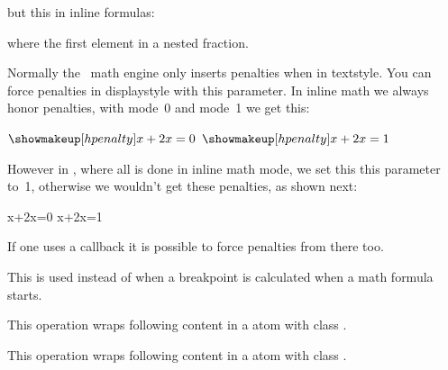 \def\foo{(\the\mathmainstyle,\the\mathparentstyle,\the\mathstyle)}

\dm{
    \frac{\frac{\foo}{\foo}}{\frac{\foo}{\foo}} + \foo
}

but this in inline formulas:

\im{
    \frac{\frac{\foo}{\foo}}{\frac{\foo}{\foo}} + \foo
}

where the first element in a nested fraction.

\stopnewprimitive

\startnewprimitive[title={\prm {mathpenaltiesmode}}]

Normally the \TEX\ math engine only inserts penalties when in textstyle. You can
force penalties in displaystyle with this parameter. In inline math we always
honor penalties, with mode~0 and mode~1 we get this:

\pushoverloadmode

\startlines
{ \let\mathpenaltiesmode\scratchcounter $\showmakeup[hpenalty]x+2x=0$}
{ \let\mathpenaltiesmode\scratchcounter $\showmakeup[hpenalty]x+2x=1$}
\stoplines

However in \CONTEXT, where all is done in inline math mode, we set this this
parameter to~1, otherwise we wouldn't get these penalties, as shown next:

{ \let\mathpenaltiesmode\scratchcounter \startformula \showmakeup[hpenalty]x+2x=0 \stopformula}
{ \let\mathpenaltiesmode\scratchcounter \startformula \showmakeup[hpenalty]x+2x=1 \stopformula}

\popoverloadmode

If one uses a callback it is possible to force penalties from there too.

\stopnewprimitive

\startnewprimitive[title={\prm {mathpretolerance}}]

This is used instead of  when a breakpoint is calculated when
a math formula starts.

\stopnewprimitive

\startoldprimitive[title={\prm {mathpunct}}]

This operation wraps following content in a atom with class .

\stopoldprimitive

\startoldprimitive[title={\prm {mathrel}}]

This operation wraps following content in a atom with class .

